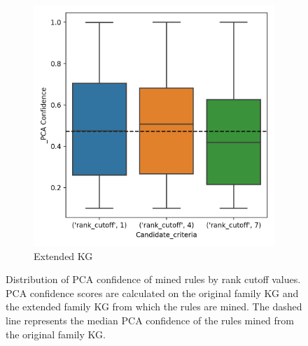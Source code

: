 \begin{figure}[htb]
\begin{subfigure}{.5\textwidth}
  \includegraphics[width=1\linewidth]{figures/results/ranks/_PCA-rank_family.png}
  \caption{Extended KG}
  \label{fig:_PCA_rank_family_boxplot_sub}
\end{subfigure}
\caption[Dist. of PCA conf. of rules over rank cutoff values - family KG.]{Distribution of PCA confidence of mined rules by rank cutoff values. PCA confidence scores are calculated on the original family KG and the extended family KG from which the rules are mined. The dashed line represents the median PCA confidence of the rules mined from the original family KG.}
\label{fig:PCA_rank_family_boxplot}
\end{figure}







